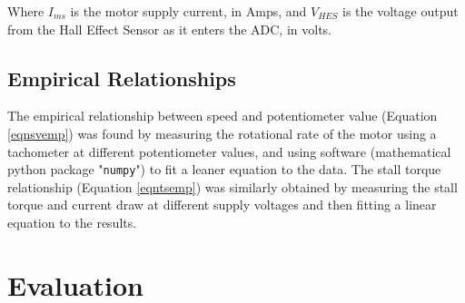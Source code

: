 \documentclass[twoside,a4]{report}
\def\br{\newline \newline \noindent}
\begin{document}
	
	\noindent
	Where \(I_{ms}\) is the motor supply current, in Amps, and \(V_{HES}\) is the voltage output from the Hall Effect Sensor as it enters the ADC, in volts.
	
	\subsection*{Empirical Relationships} %
	 The empirical relationship between speed and potentiometer value (Equation \ref{eqnsvemp}) was found by measuring the rotational rate of the motor using a tachometer at different potentiometer values, and using software (mathematical python package "\texttt{numpy}") to fit a leaner equation to the data. The stall torque relationship (Equation \ref{eqntsemp}) was similarly obtained by measuring the stall torque and current draw at different supply voltages and then fitting a linear equation to the results.\br 

	\section{Evaluation} %
	
\end{document}
